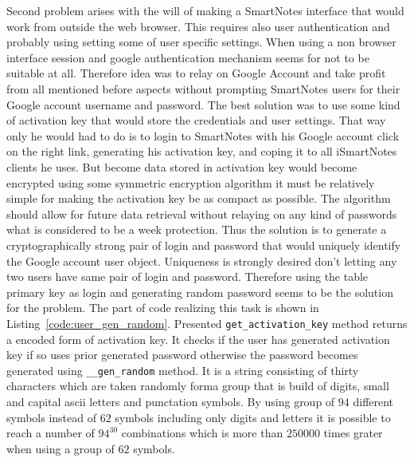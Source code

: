 \begin{itemize}
{Second problem arises with the will of making a SmartNotes interface that would work from outside the web browser. This requires also user authentication and probably using setting some of user specific settings. When using a non browser interface session and google authentication mechanism seems for not to be suitable at all. Therefore idea was to relay on Google Account and take profit from all mentioned before aspects without prompting SmartNotes users for their Google account username and password. The best solution was to use some kind of activation key that would store the credentials and user settings. That way only he would had to do is to login to SmartNotes with his Google account click on the right link, generating his activation key, and coping it to all iSmartNotes clients he uses. But become data stored in activation key would become encrypted using some symmetric encryption algorithm it must be relatively simple for making the activation key be as compact as possible. The algorithm should allow for future data retrieval without relaying on any kind of passwords what is considered to be a week protection. Thus the solution is to generate a cryptographically strong pair of login and password that would uniquely identify the Google account user object.
Uniqueness is strongly desired don't letting any two users have same pair of login and password. Therefore using the table primary key as login and generating random password seems to be the solution for the problem. The part of code realizing this task is shown in Listing~\ref{code:user_gen_random}. Presented \texttt{get\_activation\_key} method returns a encoded form of activation key. It checks if the user has generated activation key if so uses prior generated password otherwise the password becomes generated using \texttt{\_\_gen\_random} method. It is a string consisting of thirty characters which are taken randomly forma group that is build of digits, small and capital ascii letters and punctation symbols. By using group of $94$ different symbols instead of $62$ symbols including only digits and letters it is possible to reach a number of $94^{30}$  combinations which is more than $250000$ times grater when using a group of $62$ symbols. 
\lstset{language=Python,caption=Part of Python User class used to model SmartNotes users.,label=code:user_gen_random,
basicstyle=\scriptsize,         %
showspaces=false,               %
showstringspaces=false,         %
showtabs=false,                 %
}}
\end{itemize}
